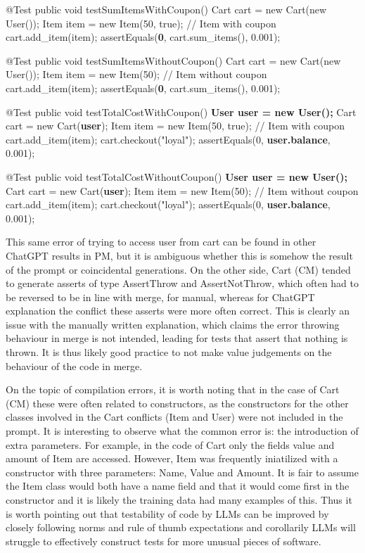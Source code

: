 \begin{response}
@Test
public void testSumItemsWithCoupon() {
    Cart cart = new Cart(new User());
    Item item = new Item(50, true); // Item with coupon
    cart.add_item(item);
    assertEquals(\textbf{0}, cart.sum_items(), 0.001);
}

@Test
public void testSumItemsWithoutCoupon() {
    Cart cart = new Cart(new User());
    Item item = new Item(50); // Item without coupon
    cart.add_item(item);
    assertEquals(\textbf{0}, cart.sum_items(), 0.001);
}

@Test
public void testTotalCostWithCoupon() {
    \textbf{User user = new User();}
    Cart cart = new Cart(\textbf{user});
    Item item = new Item(50, true); // Item with coupon
    cart.add_item(item);
    cart.checkout("loyal");
    assertEquals(0, \textbf{user.balance}, 0.001);
}

@Test
public void testTotalCostWithoutCoupon() {
    \textbf{User user = new User();}
    Cart cart = new Cart(\textbf{user});
    Item item = new Item(50); // Item without coupon
    cart.add_item(item);
    cart.checkout("loyal");
    assertEquals(0, \textbf{user.balance}, 0.001);
}
\end{response}
This same error of trying to access user from cart can be found in other ChatGPT results in PM, but it is ambiguous
whether this is somehow the result of the prompt or coincidental generations. On the other side, Cart (CM) tended to generate
asserts of type AssertThrow and AssertNotThrow, which often had to be reversed to be in line with merge, for manual, whereas for
ChatGPT explanation the conflict these asserts were more often correct. This is clearly an issue with the manually written explanation,
which claims the error throwing behaviour in merge is not intended, leading for tests that assert that nothing is thrown.
It is thus likely good practice to not make value judgements on the behaviour of the code in merge.

On the topic of compilation errors, it is worth noting that in the case of Cart (CM) these were often related to constructors, as the constructors
for the other classes involved in the Cart conflicts (Item and User) were not included in the prompt. It is interesting
to observe what the common error is: the introduction of extra parameters. For example, in the code of Cart only the fields
value and amount of Item are accessed. However, Item was frequently iniatilized with a constructor with three parameters: Name,
Value and Amount. It is fair to assume the Item class would both have a name field and that it would come first in the constructor
and it is likely the training data had many examples of this. Thus it is worth pointing out that testability of code by LLMs can be
improved by closely following norms and rule of thumb expectations and corollarily LLMs will struggle to effectively construct tests
for more unusual pieces of software.

